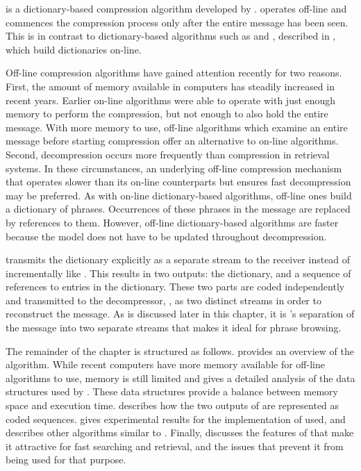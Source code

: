 

\repair is a dictionary-based compression algorithm developed by
\citet{lm00:procieee}.  \repair operates off-line and commences the
compression process only after the entire message has been seen.
This is in contrast to dictionary-based algorithms such as \lza 
and \lzb, described in , which build 
dictionaries on-line.  

Off-line compression algorithms have gained 
attention recently for two reasons.  First, the amount of memory
available in computers has steadily increased in recent years.
Earlier on-line
algorithms were able to operate with just enough memory to
perform the compression, but not enough to also hold the
entire message.  With more memory to use, off-line algorithms
which examine an entire message before starting
compression offer an alternative to on-line algorithms.
Second, decompression occurs more frequently than compression 
in retrieval systems.  In these circumstances,
an underlying off-line compression mechanism that operates slower
than its on-line counterparts but ensures fast decompression may
be preferred.  
As with on-line dictionary-based algorithms, off-line ones build
a dictionary of phrases.  Occurrences of these phrases in the
message are replaced by references to them.  However, off-line
dictionary-based algorithms are faster because the model does not
have to be updated throughout decompression.

\repair transmits the dictionary explicitly as a separate stream
to the receiver instead of incrementally like \lza.  This 
results in two outputs:  the dictionary, and a sequence of 
references to entries in the dictionary.  These two parts are coded 
independently and transmitted to the decompressor, \despair, 
as two distinct streams in order to
reconstruct the message.  As is discussed later in this chapter, 
it is \repair's separation of the message into two separate
streams that makes it ideal for phrase browsing.

The remainder of the chapter is structured as follows.  
 provides an overview of the \repair 
algorithm.  While recent computers have more memory available 
for off-line algorithms to use, memory is still limited and 
 gives a detailed analysis of 
the data structures used by \repair.  These data structures 
provide a balance between memory space and
execution time.   describes how the
two outputs of \repair are represented as coded sequences.  
gives experimental results for the implementation of \repair
used, and  describes other algorithms
similar to \repair.  Finally, 
discusses the features of \repair that make it attractive for 
fast searching and retrieval, and the issues that prevent it 
from being used for that purpose.

